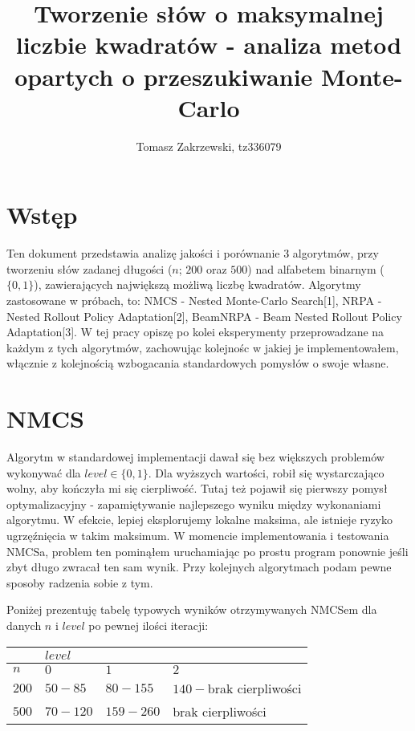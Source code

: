 \documentclass[a4paper,10pt]{article}
\title{Tworzenie słów o maksymalnej liczbie kwadratów - analiza metod opartych o przeszukiwanie Monte-Carlo}
\author{Tomasz Zakrzewski, tz336079}
\begin{document}
\maketitle

\section{Wstęp}
Ten dokument przedstawia analizę jakości i porównanie 3 algorytmów, przy tworzeniu słów zadanej długości ($n$; $200$ oraz $500$) 
nad alfabetem binarnym ($\{0, 1\}$), zawierających największą możliwą liczbę kwadratów. Algorytmy zastosowane w próbach, to: NMCS
- Nested Monte-Carlo Search[1], NRPA - Nested Rollout Policy Adaptation[2], BeamNRPA - Beam Nested Rollout Policy Adaptation[3].
W tej pracy opiszę po kolei eksperymenty przeprowadzane na każdym z tych algorytmów, zachowując kolejnośc w jakiej je implementowałem,
włącznie z kolejnością wzbogacania standardowych pomysłów o swoje własne.

\section{NMCS}
Algorytm w standardowej implementacji dawał się bez większych problemów wykonywać dla $level \in \{0, 1\}$. Dla wyższych wartości, robił
się wystarczająco wolny, aby kończyła mi się cierpliwość. Tutaj też pojawił się pierwszy pomysł optymalizacyjny - zapamiętywanie najlepszego
wyniku między wykonaniami algorytmu. W efekcie, lepiej eksplorujemy lokalne maksima, ale istnieje ryzyko ugrzęźnięcia w takim maksimum. 
W momencie implementowania i testowania NMCSa, problem ten pominąłem uruchamiając po prostu program ponownie jeśli zbyt długo zwracał ten 
sam wynik. Przy kolejnych algorytmach podam pewne sposoby radzenia sobie z tym.

Poniżej prezentuję tabelę typowych wyników otrzymywanych NMCSem dla danych $n$ i $level$ po pewnej ilości iteracji: \\
\begin{adjustbox}{center}
\begin{tabularx}{0.7\linewidth}{|X|X|X|X| }
  \hline
  & \multicolumn{3}{|X|}{$level$} \\
  \hline
  $n$ & $0$ & $1$ & $2$ \\
  \hline
  $200$ & $50 - 85$ & $80 - 155$ & $140-$brak cierpliwości \\
  \hline
  $500$ & $70 - 120$ & $159 - 260$ & brak cierpliwości \\
  \hline
\end{tabularx}
\end{adjustbox}
\end{document}
